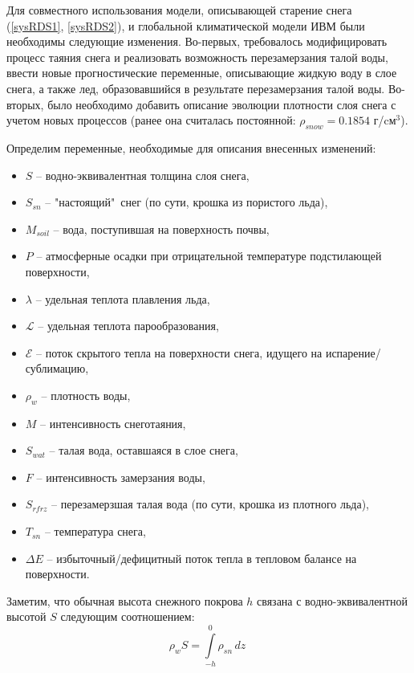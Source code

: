 \documentclass[a4paper, fontsize=14pt]{scrartcl}
\begin{document}
Для совместного использования модели, описывающей старение снега (\eqref{sysRDS1}, \eqref{sysRDS2}), и глобальной климатической модели ИВМ были необходимы следующие изменения. Во-первых, требовалось модифицировать процесс таяния снега и реализовать возможность перезамерзания талой воды, ввести новые прогностические переменные, описывающие жидкую воду в слое снега, а также лед, образовавшийся в результате перезамерзания талой воды. Во-вторых, было необходимо добавить описание эволюции плотности слоя снега с учетом новых процессов (ранее она считалась постоянной: $\rho_{snow} = 0.1854 $ г/cм$^3$).

\newpage
Определим переменные, необходимые для описания внесенных изменений: 
\begin{itemize}
    \item $S$ -- водно-эквивалентная толщина слоя снега,
    \item $S_{sn}$ -- "настоящий"\  снег (по сути, крошка из пористого льда), 
    \item $M_{soil}$ -- вода, поступившая на поверхность почвы,
    \item $P$ -- атмосферные осадки при отрицательной температуре подстилающей поверхности,
    \item $\lambda$ -- удельная теплота плавления льда, 
    \item $\mathcal{L}$ -- удельная теплота парообразования, 
    \item $\mathcal{E}$ -- поток скрытого тепла на поверхности снега, идущего на испарение/сублимацию,
    \item $\rho_w$ -- плотность воды,
    \item $M$ -- интенсивность снеготаяния,
    \item $S_{wat}$ -- талая вода, оставшаяся в слое снега,
    \item $F$ -- интенсивность замерзания воды,
    \item $S_{rfrz}$ -- перезамерзшая талая вода (по сути, крошка из плотного льда),
    \item $T_{sn}$ -- температура снега, 
    \item $\Delta E$ -- избыточный/дефицитный поток тепла в тепловом балансе на поверхности.
\end{itemize}
Заметим, что обычная высота снежного покрова $h$ связана с водно-эквивалентной высотой $S$ следующим соотношением:
\begin{equation}
    \rho_w S =  \int\limits_{-h}^0 \rho_{sn} \, dz\  \label{sys}
\end{equation}
\end{document}
